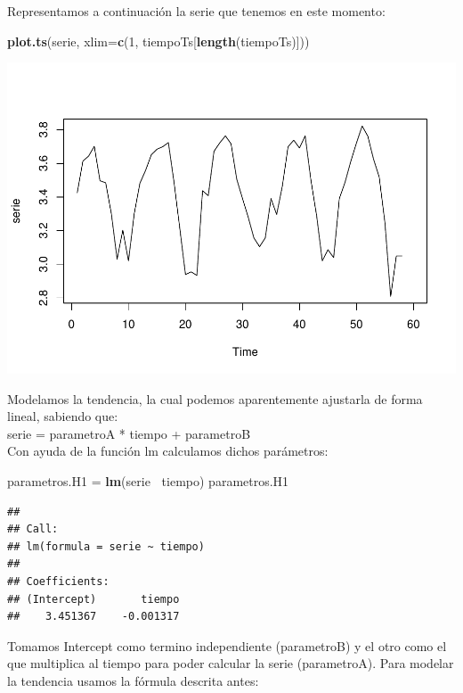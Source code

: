 \documentclass[]{article}
\newenvironment{Shaded}{\begin{snugshade}}{\end{snugshade}}
\newcommand{\KeywordTok}[1]{\textcolor[rgb]{0.13,0.29,0.53}{\textbf{#1}}}
\newcommand{\DataTypeTok}[1]{\textcolor[rgb]{0.13,0.29,0.53}{#1}}
\newcommand{\DecValTok}[1]{\textcolor[rgb]{0.00,0.00,0.81}{#1}}
\newcommand{\StringTok}[1]{\textcolor[rgb]{0.31,0.60,0.02}{#1}}
\newcommand{\OperatorTok}[1]{\textcolor[rgb]{0.81,0.36,0.00}{\textbf{#1}}}
\newcommand{\NormalTok}[1]{#1}
\begin{document}
Representamos a continuación la serie que tenemos en este momento:

\begin{Shaded}
\begin{Highlighting}[]
\KeywordTok{plot.ts}\NormalTok{(serie,  }\DataTypeTok{xlim=}\KeywordTok{c}\NormalTok{(}\DecValTok{1}\NormalTok{, tiempoTs[}\KeywordTok{length}\NormalTok{(tiempoTs)]))}
\end{Highlighting}
\end{Shaded}

\includegraphics{timeSeries_files/figure-latex/unnamed-chunk-11-1.pdf}

Modelamos la tendencia, la cual podemos aparentemente ajustarla de forma
lineal, sabiendo que:\\
serie = parametroA * tiempo + parametroB\\
Con ayuda de la función lm calculamos dichos parámetros:

\begin{Shaded}
\begin{Highlighting}[]
\NormalTok{parametros.H1 =}\StringTok{ }\KeywordTok{lm}\NormalTok{(serie }\OperatorTok{~}\NormalTok{tiempo)}
\NormalTok{parametros.H1}
\end{Highlighting}
\end{Shaded}

\begin{verbatim}
## 
## Call:
## lm(formula = serie ~ tiempo)
## 
## Coefficients:
## (Intercept)       tiempo  
##    3.451367    -0.001317
\end{verbatim}

Tomamos Intercept como termino independiente (parametroB) y el otro como
el que multiplica al tiempo para poder calcular la serie (parametroA).
Para modelar la tendencia usamos la fórmula descrita antes:
\end{document}

